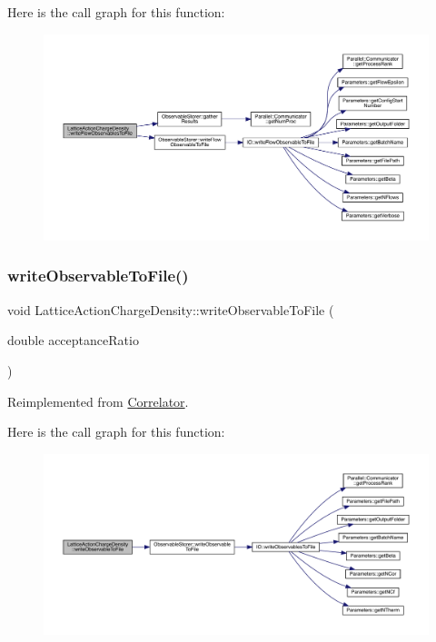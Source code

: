 Here is the call graph for this function\+:\nopagebreak
\begin{figure}[H]
\begin{center}
\leavevmode
\includegraphics[width=350pt]{class_lattice_action_charge_density_a54226556dc1497c311e4a4d50bf44c26_cgraph}
\end{center}
\end{figure}
\mbox{\label{class_lattice_action_charge_density_a719f71aaccbf1b4147ea944781d69908}} 
\subsubsection{\texorpdfstring{writeObservableToFile()}{writeObservableToFile()}}
{\footnotesize\ttfamily void Lattice\+Action\+Charge\+Density\+::write\+Observable\+To\+File (\begin{DoxyParamCaption}\item[{double}]{acceptance\+Ratio }\end{DoxyParamCaption})\hspace{0.3cm}{\ttfamily [virtual]}}



Reimplemented from \mbox{\hyperlink{class_correlator_a9e8d80e30e4fbe3b7fe57521538cb5ff}{Correlator}}.

Here is the call graph for this function\+:\nopagebreak
\begin{figure}[H]
\begin{center}
\leavevmode
\includegraphics[width=350pt]{class_lattice_action_charge_density_a719f71aaccbf1b4147ea944781d69908_cgraph}
\end{center}
\end{figure}


